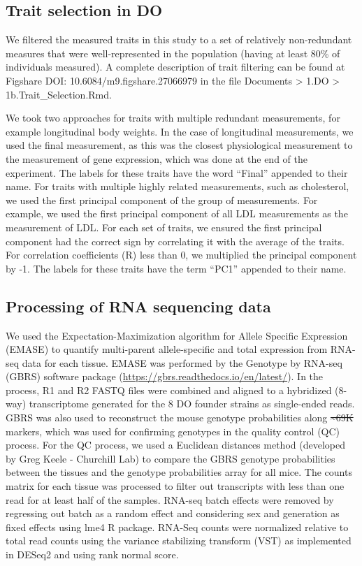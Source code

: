 \documentclass[
]{article}
\providecommand{\DIFaddtex}[1]{{\protect\color{blue}\uwave{#1}}} %
\providecommand{\DIFdeltex}[1]{{\protect\color{red}\sout{#1}}}                      %
\providecommand{\DIFaddbegin}{} %
\providecommand{\DIFaddend}{} %
\providecommand{\DIFdelbegin}{} %
\providecommand{\DIFdelend}{} %
\providecommand{\DIFadd}[1]{\texorpdfstring{\DIFaddtex{#1}}{#1}} %
\providecommand{\DIFdel}[1]{\texorpdfstring{\DIFdeltex{#1}}{}} %
\newcommand{\DIFscaledelfig}{0.5}
\newlength{\DIFdelgraphicswidth} %
\newlength{\DIFdelgraphicsheight} %
\newcommand{\DIFaddincludegraphics}[2][]{{\color{blue}\fbox{\DIFOincludegraphics[#1]{#2}}}} %
\newcommand{\DIFdelincludegraphics}[2][]{%
\sbox{\DIFdelgraphicsbox}{\DIFOincludegraphics[#1]{#2}}%
\settoboxwidth{\DIFdelgraphicswidth}{\DIFdelgraphicsbox} %
\settoboxtotalheight{\DIFdelgraphicsheight}{\DIFdelgraphicsbox} %
\scalebox{\DIFscaledelfig}{%
\parbox[b]{\DIFdelgraphicswidth}{\usebox{\DIFdelgraphicsbox}\\[-\baselineskip] \rule{\DIFdelgraphicswidth}{0em}}\llap{\resizebox{\DIFdelgraphicswidth}{\DIFdelgraphicsheight}{%
\setlength{\unitlength}{\DIFdelgraphicswidth}%
\begin{picture}(1,1)%
\thicklines\linethickness{2pt} %
{\color[rgb]{1,0,0}\put(0,0){\framebox(1,1){}}}%
{\color[rgb]{1,0,0}\put(0,0){\line( 1,1){1}}}%
{\color[rgb]{1,0,0}\put(0,1){\line(1,-1){1}}}%
\end{picture}%
}\hspace*{3pt}}} %
} %
\DeclareRobustCommand{\DIFaddbegin}{\DIFOaddbegin \let\includegraphics\DIFaddincludegraphics} %
\DeclareRobustCommand{\DIFaddend}{\DIFOaddend \let\includegraphics\DIFOincludegraphics} %
\DeclareRobustCommand{\DIFdelbegin}{\DIFOdelbegin \let\includegraphics\DIFdelincludegraphics} %
\DeclareRobustCommand{\DIFdelend}{\DIFOaddend \let\includegraphics\DIFOincludegraphics} %
\begin{document}
\subsection{Trait selection in DO}\label{trait-selection-in-do}

We filtered the measured traits in this study to a set of relatively
non-redundant measures that were well-represented in the population
(having at least 80\% of individuals measured). A complete description
of trait filtering can be found at Figshare DOI:
10.6084/m9.figshare.27066979 in the file Documents \textgreater{} 1.DO
\textgreater{} 1b.Trait\_Selection.Rmd.

We took two approaches for traits with multiple redundant measurements,
for example longitudinal body weights. In the case of longitudinal
measurements, we used the final measurement, as this was the closest
physiological measurement to the measurement of gene expression, which
was done at the end of the experiment. The labels for these traits have
the word ``Final'' appended to their name. For traits with multiple
highly related measurements, such as cholesterol, we used the first
principal component of the group of measurements. For example, we used
the first principal component of all LDL measurements as the measurement
of LDL. For each set of traits, we ensured the first principal component
had the correct sign by correlating it with the average of the traits.
For correlation coefficients (R) less than 0, we multiplied the
principal component by -1. The labels for these traits have the term
``PC1'' appended to their name.

\subsection{Processing of RNA sequencing
data}\label{processing-of-rna-sequencing-data}

We used the Expectation-Maximization algorithm for Allele Specific
Expression (EMASE) \cite{pmid29444201, pmid25236449} to quantify
multi-parent allele-specific and total expression from RNA-seq data for
each tissue. EMASE was performed by the Genotype by RNA-seq (GBRS)
software package (\url{https://gbrs.readthedocs.io/en/latest/}). In the
process, R1 and R2 FASTQ files were combined and aligned to a hybridized
(8-way) transcriptome generated for the 8 DO founder strains as
single-ended reads. GBRS was also used to reconstruct the mouse genotype
probabilities along \DIFdelbegin \DIFdel{\textasciitilde69K }\DIFdelend \DIFaddbegin \DIFadd{\(\sim69\)K }\DIFaddend markers, which was used for confirming
genotypes in the quality control (QC) process. For the QC process, we
used a Euclidean distances method (developed by Greg Keele - Churchill
Lab) to compare the GBRS genotype probabilities between the tissues and
the genotype probabilities array for all mice. The counts matrix for
each tissue was processed to filter out transcripts with less than one
read for at least half of the samples. RNA-seq batch effects were
removed by regressing out batch as a random effect and considering sex
and generation as fixed effects using lme4 R package. RNA-Seq counts
were normalized relative to total read counts using the variance
stabilizing transform (VST) as implemented in DESeq2 and using rank
normal score.
\end{document}
